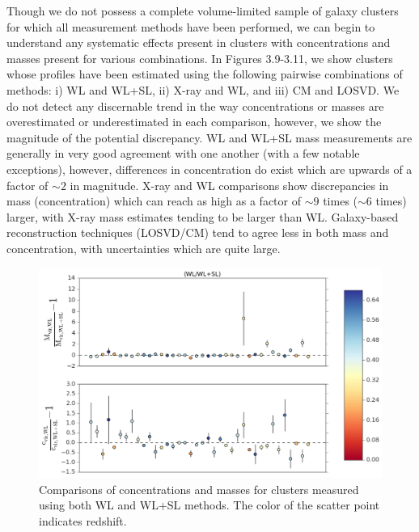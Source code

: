 Though we do not possess a complete volume-limited sample of galaxy clusters 
for which all measurement methods have been performed, we can begin to
understand any systematic effects present in clusters with concentrations and
masses present for various combinations. In Figures 3.9-3.11, we show clusters whose
profiles have been estimated using the following pairwise combinations of
methods: i) WL and WL+SL, ii) X-ray and WL, and iii) CM and LOSVD. We do not
detect any discernable trend in the way concentrations or masses are
overestimated or underestimated in each comparison, however, we show the
magnitude of the potential discrepancy. WL and WL+SL mass measurements are
generally in very good agreement with one another (with a few notable
exceptions), however, differences in concentration do exist which are upwards
of a factor of $\mathrm{\sim 2}$ in magnitude. X-ray and WL comparisons show
discrepancies in mass (concentration) which can reach as high as a factor of
$\mathrm{\sim 9}$ times ($\mathrm{\sim 6}$ times) larger, with X-ray mass
estimates tending to be larger than WL. Galaxy-based reconstruction
techniques (LOSVD/CM) tend to agree less in both mass and concentration, with
uncertainties which are quite large. 

\begin{figure}
\begin{center}
\includegraphics[width=1.0\textwidth]{./images/CMRelationProject/WL_WL+SL_Comparison.png}
\end{center}
\caption[WL and WL+SL Cluster Measurements]{Comparisons of concentrations and masses for clusters measured
  using both WL and WL+SL methods. The color of the scatter point indicates
redshift.}
\end{figure}


